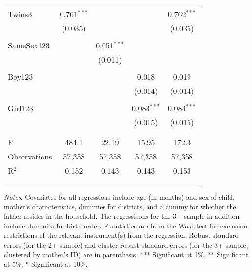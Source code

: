 \begin{wraptable}{L}{10.5cm}
\begin{singlespace}
\begin{threeparttable}
\begin{tabular}{@{\extracolsep{5pt}}lcccc}
 \\
 \\[-1.5ex]
 Twins3 & 0.761$^{***}$ &  &  & 0.762$^{***}$ \\ 
  & (0.035) &  &  & (0.035) \\ 
  & & & & \\ 
 SameSex123 &  & 0.051$^{***}$ &  &  \\ 
  &  & (0.011) &  &  \\ 
  & & & & \\ 
 Boy123 &  &  & 0.018 & 0.019 \\ 
  &  &  & (0.014) & (0.014) \\ 
  & & & & \\ 
 Girl123 &  &  & 0.083$^{***}$ & 0.084$^{***}$ \\ 
  &  &  & (0.015) & (0.015) \\ 
  & & & & \\ 
\cline{2-5} \\[-2.0ex]
F & 484.1 & 22.19 & 15.95 & 172.3 \\ 
Observations & 57,358 & 57,358 & 57,358 & 57,358 \\ 
R$^{2}$ & 0.152 & 0.143 & 0.143 & 0.153 \\ 
\\[-2.0ex]
\hline 
\hline \\[-1.8ex] 
\end{tabular} 
\begin{tablenotes}
\footnotesize
\item \textit{Notes:} Covariates for all regressions include age (in months) and sex of child, 
mother's characteristics, dummies for districts, and a dummy for whether the father resides in the household.
The regressisons for the 3+ sample in addition include dummies for birth order. F statistics are from the Wald 
test for exclusion restrictions of the relevant instrument(s) from the regression. Robust standard errors 
(for the 2+ sample) and cluster robust standard errors (for the 3+ sample; clustered by mother's ID) are in parenthesis. 
*** Significant at 1\%, ** Significant at 5\%, * Significant at 10\%.
\end{tablenotes}
\end{threeparttable}
\end{singlespace}
\vspace{-30pt}
\end{wraptable} 




